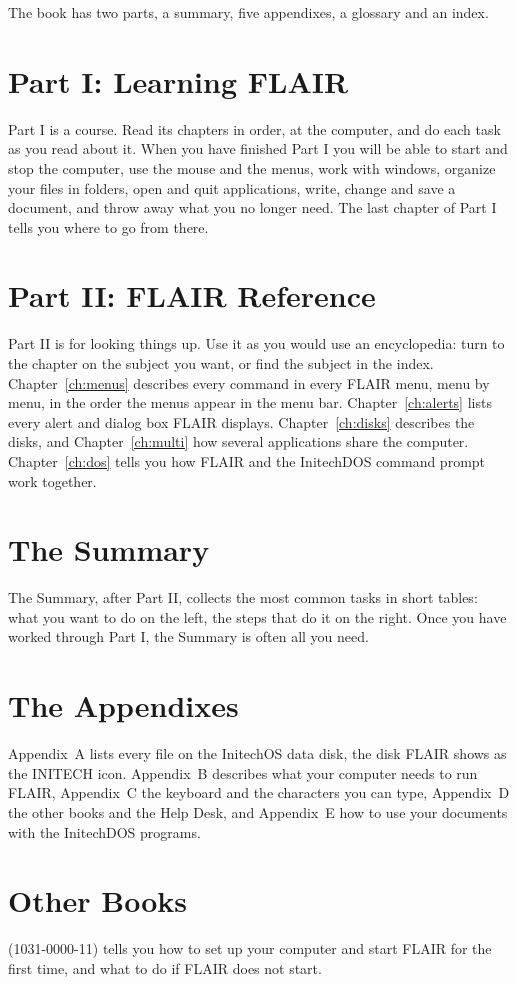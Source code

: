 The book has two parts, a summary, five appendixes, a glossary and an index.

\section{Part I: Learning FLAIR}
Part I is a course.  Read its chapters in order, at the computer, and do
each task as you read about it.  When you have finished Part I you will be
able to start and stop the computer, use the mouse and the menus, work with
windows, organize your files in folders, open and quit applications,
write, change and save a document, and throw away what you no longer need.
The last chapter of Part I tells you where to go from there.

\section{Part II: FLAIR Reference}
Part II is for looking things up.  Use it as you would use an encyclopedia:
turn to the chapter on the subject you want, or find the subject in the
index.  Chapter~\ref{ch:menus} describes every command in every FLAIR menu, menu by
menu, in the order the menus appear in the menu bar.  Chapter~\ref{ch:alerts} lists
every alert and dialog box FLAIR displays.  Chapter~\ref{ch:disks}
describes the disks, and Chapter~\ref{ch:multi} how several applications
share the computer.  Chapter~\ref{ch:dos} tells you how FLAIR and the
InitechDOS command prompt work together.

\section{The Summary}
The Summary, after Part II, collects the most common tasks in short tables:
what you want to do on the left, the steps that do it on the right.  Once
you have worked through Part I, the Summary is often all you need.

\section{The Appendixes}
Appendix~A lists every file on the InitechOS data disk, the disk FLAIR
shows as the INITECH icon.  Appendix~B describes what your computer needs
to run FLAIR, Appendix~C the keyboard and the characters you can type,
Appendix~D the other books and the Help Desk, and Appendix~E how to use
your documents with the InitechDOS programs.

\section{Other Books}
(1031-0000-11) tells you how to set up your computer and start FLAIR for
the first time, and what to do if FLAIR does not start.

